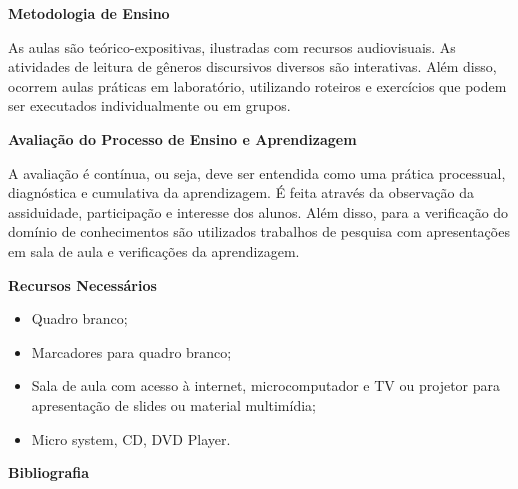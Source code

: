 
\begin{snugshade}\begin{center}\textbf{
    Metodologia de Ensino
}\end{center}\end{snugshade}

\noindent
As aulas são teórico-expositivas, ilustradas com recursos audiovisuais. As atividades de leitura de gêneros discursivos diversos são interativas. Além disso, ocorrem aulas práticas em laboratório, utilizando roteiros e exercícios que podem ser executados individualmente ou em grupos.

\begin{snugshade}\begin{center}\textbf{
    Avaliação do Processo de Ensino e Aprendizagem
}\end{center}\end{snugshade}

\noindent
           A avaliação é contínua, ou seja, deve ser entendida como uma prática processual, diagnóstica e cumulativa da aprendizagem. É feita através da observação da assiduidade, participação e interesse dos alunos. Além disso, para a verificação do domínio de conhecimentos são utilizados trabalhos de pesquisa com apresentações em sala de aula e verificações da aprendizagem.

\begin{snugshade}\begin{center}\textbf{
    Recursos Necessários
    \vphantom{q} %
}\end{center}\end{snugshade}

\begin{itemize}
  \item Quadro branco;
  \item Marcadores para quadro branco;
  \item Sala de aula com acesso à internet, microcomputador e TV ou projetor para apresentação de slides ou material multimídia;
  \item Micro system, CD, DVD Player.
\end{itemize}


\begin{snugshade}\begin{center}\textbf{
    Bibliografia
}\end{center}\end{snugshade}

